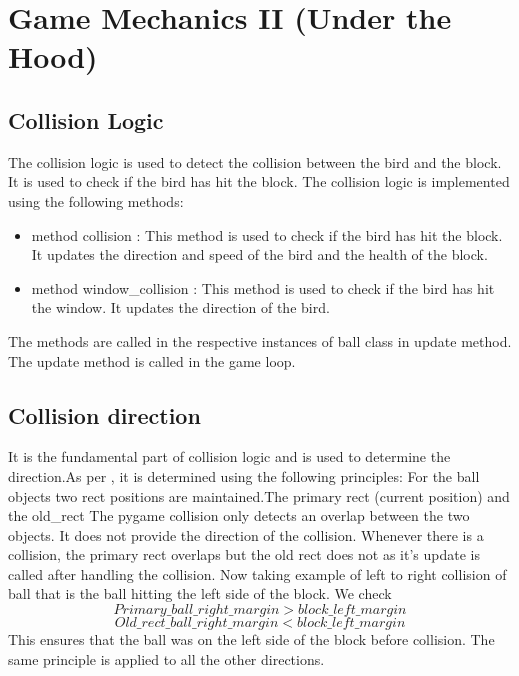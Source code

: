 \documentclass{article}
\begin{document}
\section{Game Mechanics II (Under the Hood)}
\subsection{Collision Logic}
The collision logic is used to detect the collision between the bird and the block. It is used to check if the bird has hit the block. The collision logic is implemented using the following methods:
\begin{itemize}
    \item method collision : This method is used to check if the bird has hit the block. It updates the direction and speed of the bird and the health of the block.
    \item method window\_collision : This method is used to check if the bird has hit the window. It updates the direction of the bird.
\end{itemize}
The methods are called in the respective instances of ball class in update method. The update method is called in the game loop.

\subsection{Collision direction}
\begin{flushleft}
    It is the fundamental part of collision logic and is used to determine the direction.As per \cite{Collisions}, it is determined using the following principles:\linebreak \linebreak
For the ball objects two rect positions are maintained.\newline The primary rect (current position) and the old\_rect
The pygame collision only detects an overlap between the two objects. It does not provide the direction of the collision.
\linebreak
Whenever there is a collision, the primary rect overlaps but the old rect does not as it's update is called after handling the collision.
\linebreak
Now taking example of left to right collision of ball that is the ball hitting the left side of the block.
\newline
We check
\begin{equation}
    Primary\_ball\_right\_margin > block\_left\_margin
\end{equation}
\begin{equation}
    Old\_rect\_ball\_right\_margin < block\_left\_margin
\end{equation}
This ensures that the ball was on the left side of the block before collision.
\newline
The same principle is applied to all the other directions.
\end{flushleft}
\end{document}
